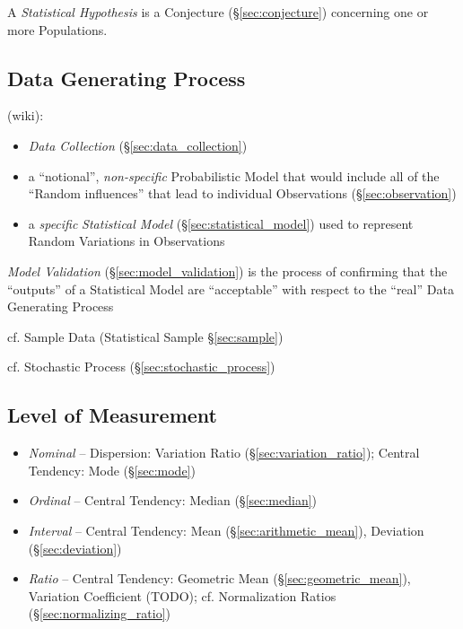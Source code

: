 A \emph{Statistical Hypothesis} is a Conjecture (\S\ref{sec:conjecture})
concerning one or more Populations.



\subsection{Data Generating Process}\label{sec:data_generating_process}

(wiki):

\begin{itemize}
  \item \emph{Data Collection} (\S\ref{sec:data_collection})
  \item a ``notional'', \emph{non-specific} Probabilistic Model
    that would include all of the ``Random influences'' that lead to individual
    Observations (\S\ref{sec:observation})
  \item a \emph{specific} \emph{Statistical Model}
    (\S\ref{sec:statistical_model}) used to represent Random Variations in
    Observations
\end{itemize}

\fist \emph{Model Validation} (\S\ref{sec:model_validation}) is the process of
confirming that the ``outputs'' of a Statistical Model are ``acceptable'' with
respect to the ``real'' Data Generating Process

\fist cf. Sample Data (Statistical Sample \S\ref{sec:sample})

\fist cf. Stochastic Process (\S\ref{sec:stochastic_process})



\subsection{Level of Measurement}\label{sec:measurement_level}

\begin{itemize}
  \item \emph{Nominal} -- Dispersion: Variation Ratio
    (\S\ref{sec:variation_ratio}); Central Tendency: Mode (\S\ref{sec:mode})
  \item \emph{Ordinal} -- Central Tendency: Median (\S\ref{sec:median})
  \item \emph{Interval} -- Central Tendency: Mean (\S\ref{sec:arithmetic_mean}),
    Deviation (\S\ref{sec:deviation})
  \item \emph{Ratio} -- Central Tendency: Geometric Mean
    (\S\ref{sec:geometric_mean}), Variation Coefficient (TODO);
    cf. Normalization Ratios (\S\ref{sec:normalizing_ratio})
\end{itemize}



